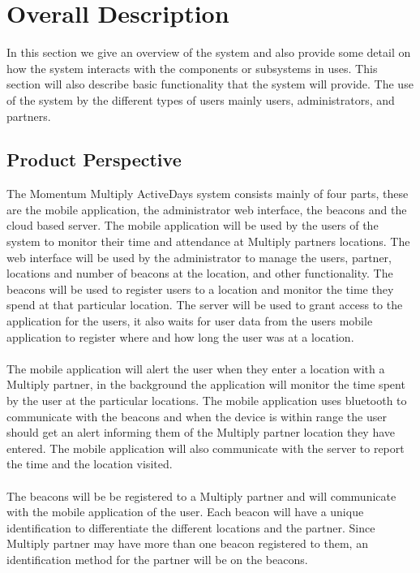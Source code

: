 \documentclass[11pt]{article}
\begin{document}
\section{Overall Description}
In this section we give an overview of the system and also provide some detail on how the system interacts with the components or subsystems in uses. This section will also describe basic functionality that the system will provide. The use of the system by the different types of users mainly users, administrators, and partners.     
\subsection{Product Perspective}
The Momentum Multiply ActiveDays system consists mainly of four parts, these are the mobile application, the administrator web interface, the beacons and the cloud based server. The mobile application will be used by the users of the system to monitor their time and attendance at Multiply partners locations. The web interface will be used by the administrator to manage the users, partner, locations and number of beacons at the location, and other functionality. The beacons will be used to register users to a location and monitor the time they spend at that particular location. The server will be used to grant access to the application for the users, it also waits for user data from the users mobile application to register where and how long the user was at a location.\\\\
The mobile application will alert the user when they enter a location with a Multiply partner, in the background the application will monitor the time spent by the user at the particular locations. The mobile application uses bluetooth to communicate with the beacons and when the device is within range the user should get an alert informing them of the Multiply partner location they have entered. The mobile application will also communicate with the server to report the time and the location visited. \\\\
The beacons will be be registered to a Multiply partner and will communicate with the mobile application of the user. Each beacon will have a unique identification to differentiate the different locations and the partner. Since Multiply partner may have more than one beacon registered to them, an identification method for the partner will be on the beacons.\\\\
\end{document}
